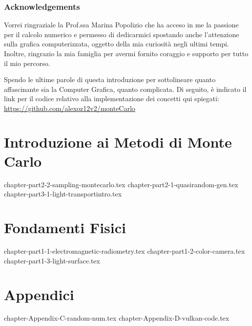 \documentclass[10pt, openany]{book}
\theoremstyle{theoremdd}
\begin{document}
	\section*{Acknowledgements}
	Vorrei ringraziale la Prof.ssa Marina Popolizio che ha acceso in me la passione per il calcolo numerico e permesso di dedicarmici spostando anche 
	l'attenzione sulla grafica computerizzata, oggetto della mia curiosit\`a negli ultimi tempi. Inoltre, ringrazio la mia famiglia per avermi fornito
	coraggio e supporto per tutto il mio percorso.\par
	Spendo le ultime parole di questa introduzione per sottolineare quanto affascinante sia la Computer Grafica, quanto complicata. Di seguito, \`e 
	indicato il link per il codice relativo alla implementazione dei concetti qui spiegati:\\
	\href{https://github.com/alexoz12v2/monteCarlo}{https://github.com/alexoz12v2/monteCarlo}

	\tableofcontents

	\mainmatter
	\part{Introduzione ai Metodi di Monte Carlo}
	{chapter-part2-2-sampling-montecarlo.tex}
	{chapter-part2-1-quasirandom-gen.tex}
	{chapter-part3-1-light-transportintro.tex}

	\part{Fondamenti Fisici}
	{chapter-part1-1-electromagnetic-radiometry.tex}
	{chapter-part1-2-color-camera.tex}
	{chapter-part1-3-light-surface.tex}

	\part{Appendici}
	\appendix
	{chapter-Appendix-C-random-num.tex}
	{chapter-Appendix-D-vulkan-code.tex}

	\backmatter
	\printbibliography

	\printglossaries
\end{document}
